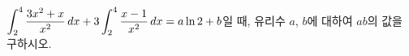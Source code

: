 $\displaystyle\int_{2}^{4}\dfrac{3x^2+x}{x^2}\mkern3mu dx+3\int_{2}^{4}\dfrac{x-1}{x^2}\mkern3mu dx=a\ln 2+b$일 때, 유리수 $a$, $b$에 대하여 $ab$의 값을 구하시오.

